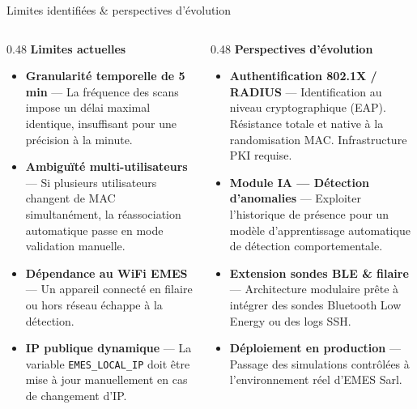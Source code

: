 \documentclass[aspectratio=169, 10pt]{beamer}
\begin{document}
\begin{frame}{Limites identifiées \& perspectives d'évolution}
  \begin{columns}[T]
    \begin{column}{0.48\textwidth}
      \textbf{\textcolor{EMESred}{\small Limites actuelles}}
      \vspace{0.2cm}

      \begin{itemize}\setlength\itemsep{6pt}
        \item \textbf{Granularité temporelle de 5 min} ---
          La fréquence des scans impose un délai maximal identique, insuffisant pour une précision à la minute.

        \item \textbf{Ambiguïté multi-utilisateurs} ---
          Si plusieurs utilisateurs changent de MAC simultanément, la réassociation automatique passe en mode validation manuelle.

        \item \textbf{Dépendance au WiFi EMES} ---
          Un appareil connecté en filaire ou hors réseau échappe à la détection.

        \item \textbf{IP publique dynamique} ---
          La variable \texttt{EMES\_LOCAL\_IP} doit être mise à jour manuellement en cas de changement d'IP.
      \end{itemize}
    \end{column}
    \begin{column}{0.48\textwidth}
      \textbf{\textcolor{EMESblue}{\small Perspectives d'évolution}}
      \vspace{0.2cm}

      \begin{itemize}\setlength\itemsep{6pt}
        \item \textbf{Authentification 802.1X / RADIUS} ---
          Identification au niveau cryptographique (EAP). Résistance totale et native à la randomisation MAC. Infrastructure PKI requise.

        \item \textbf{Module IA --- Détection d'anomalies} ---
          Exploiter l'historique de présence pour un modèle d'apprentissage automatique de détection comportementale.

        \item \textbf{Extension sondes BLE \& filaire} ---
          Architecture modulaire prête à intégrer des sondes Bluetooth Low Energy ou des logs SSH.

        \item \textbf{Déploiement en production} ---
          Passage des simulations contrôlées à l'environnement réel d'EMES Sarl.
      \end{itemize}
    \end{column}
  \end{columns}
\end{frame}
\end{document}
